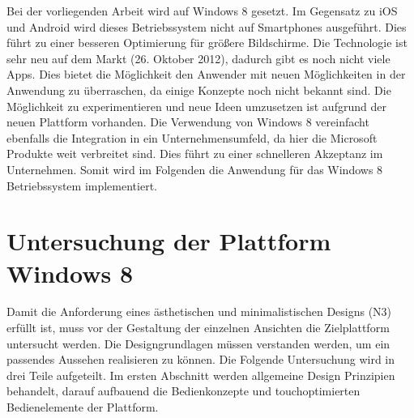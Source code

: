 Bei der vorliegenden Arbeit wird auf Windows 8 gesetzt. Im Gegensatz zu iOS und Android wird dieses Betriebssystem nicht auf Smartphones ausgeführt. Dies führt zu einer besseren Optimierung für größere Bildschirme. Die Technologie ist sehr neu auf dem Markt (26. Oktober 2012), dadurch gibt es noch nicht viele Apps. Dies bietet die Möglichkeit den Anwender mit neuen Möglichkeiten in der Anwendung zu überraschen, da einige Konzepte noch nicht bekannt sind. Die Möglichkeit zu experimentieren und neue Ideen umzusetzen ist aufgrund der neuen Plattform vorhanden.  Die Verwendung von Windows 8 vereinfacht ebenfalls die Integration in ein Unternehmensumfeld, da hier die Microsoft Produkte weit verbreitet sind. Dies führt zu einer schnelleren Akzeptanz im Unternehmen. Somit wird im Folgenden die Anwendung für das Windows 8 Betriebssystem implementiert.
        

\section{Untersuchung der Plattform Windows 8}
Damit die Anforderung eines ästhetischen und minimalistischen Designs (N3) erfüllt ist, muss vor der Gestaltung der einzelnen Ansichten die Zielplattform untersucht werden. Die Designgrundlagen müssen verstanden werden, um ein passendes Aussehen realisieren zu können. 
Die Folgende Untersuchung wird in drei Teile aufgeteilt. Im ersten Abschnitt werden allgemeine Design Prinzipien behandelt, darauf aufbauend die Bedienkonzepte und touchoptimierten Bedienelemente der Plattform.


